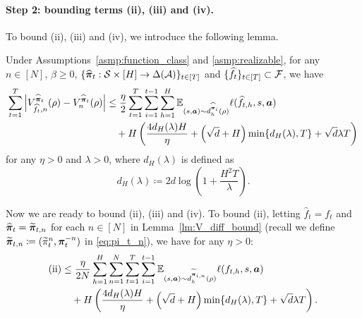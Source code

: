 \paragraph{Step 2: bounding terms (ii), (iii) and (iv).} To bound (ii), (iii) and (iv), we introduce the following lemma.  
\begin{lm}\label{lm:V_diff_bound}
    Under Assumptions~\ref{asmp:function_class} and \ref{asmp:realizable}, for any $n\in[N]$, $\beta\geq 0$, $\{\widehat{{\bm{\pi}}}_{t}: {\mathcal{S}}\times[H]\rightarrow\Delta({\mathcal{A}})\}_{t\in[T]}$ and $\{\widehat{f}_{t}\}_{t\in[T]}\subset {\mathcal{F}}$,  we have
    \begin{align}\label{eq:V_diff_bound}
       \sum_{t=1}^T \left|V_{\widehat{f}_{t},n}^{\widehat{{\bm{\pi}}}_{t}}(\rho)-V_{n}^{\widehat{{\bm{\pi}}}_{t}}(\rho)\right|&\leq \frac{\eta}{2}\sum_{t=1}^T \sum_{i=1}^{t-1}\sum_{h=1}^H \mathbb{E}_{(s,{\bm{a}})\sim d_h^{\widehat{{\bm{\pi}}}_i}(\rho)}\ell(\widehat{f}_{t,h},s,{\bm{a}}) \notag\\
       &\quad+H\left(\frac{4d_H(\lambda)H}{\eta}
       + \left(\sqrt{d}+H\right) \min\{d_H(\lambda),T\} +\sqrt{d} \lambda T\right)
    \end{align}
    for any $\eta>0$ and $\lambda>0$, where $d_H(\lambda)$ is defined as
    $$d_H(\lambda)\coloneqq 2d\log\left(1+\frac{H^2T}{\lambda}\right).$$
\end{lm}


Now we are ready to bound (ii), (iii) and (iv). To bound (ii), letting $\widehat{f}_{t}=f_t$ and
$\widehat{{\bm{\pi}}}_{t}=\widetilde{{\bm{\pi}}}_{t,n}$ for each $n \in [N]$ in Lemma~\ref{lm:V_diff_bound} (recall we define $\widetilde{{\bm{\pi}}}_{t,n}\coloneqq (\widetilde{\pi}_t^n,{\bm{\pi}}_t^{-n})$ in \eqref{eq:pi_t_n}), we have for any $\eta>0$:
\begin{align}\label{eq:b_bound} 
    \text{(ii)}&\leq \frac{\eta}{2N}\sum_{h=1}^H\sum_{n=1}^N\sum_{t=1}^T \sum_{i=1}^{t-1} \mathbb{E}_{(s,{\bm{a}})\sim d_h^{\widetilde{{\bm{\pi}}}_{i,n}}(\rho)}\ell(f_{t,h},s,{\bm{a}}) \notag\\
    &\quad+H\left(\frac{4d_H(\lambda)H}{\eta}
    + \left(\sqrt{d}+H\right) \min\{d_H(\lambda),T\} +\sqrt{d} \lambda T\right).
\end{align}

